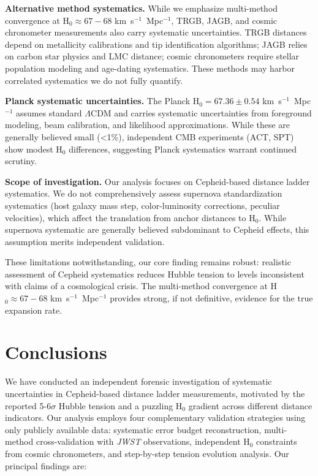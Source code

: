 \documentclass[twocolumn, linenumbers]{aastex701}
\begin{document}
\textbf{Alternative method systematics.} While we emphasize multi-method convergence at H$_0 \approx 67-68$ km~s$^{-1}$~Mpc$^{-1}$, TRGB, JAGB, and cosmic chronometer measurements also carry systematic uncertainties. TRGB distances depend on metallicity calibrations and tip identification algorithms; JAGB relies on carbon star physics and LMC distance; cosmic chronometers require stellar population modeling and age-dating systematics. These methods may harbor correlated systematics we do not fully quantify.

\textbf{Planck systematic uncertainties.} The Planck H$_0 = 67.36 \pm 0.54$ km~s$^{-1}$~Mpc$^{-1}$ assumes standard $\Lambda$CDM and carries systematic uncertainties from foreground modeling, beam calibration, and likelihood approximations. While these are generally believed small (<1\%), independent CMB experiments (ACT, SPT) show modest H$_0$ differences, suggesting Planck systematics warrant continued scrutiny.

\textbf{Scope of investigation.} Our analysis focuses on Cepheid-based distance ladder systematics. We do not comprehensively assess supernova standardization systematics (host galaxy mass step, color-luminosity corrections, peculiar velocities), which affect the translation from anchor distances to H$_0$. While supernova systematic are generally believed subdominant to Cepheid effects, this assumption merits independent validation.

These limitations notwithstanding, our core finding remains robust: realistic assessment of Cepheid systematics reduces Hubble tension to levels inconsistent with claims of a cosmological crisis. The multi-method convergence at H$_0 \approx 67-68$ km~s$^{-1}$~Mpc$^{-1}$ provides strong, if not definitive, evidence for the true expansion rate.


\section{Conclusions} \label{sec:conclusions}

We have conducted an independent forensic investigation of systematic uncertainties in Cepheid-based distance ladder measurements, motivated by the reported 5-6$\sigma$ Hubble tension and a puzzling H$_0$ gradient across different distance indicators. Our analysis employs four complementary validation strategies using only publicly available data: systematic error budget reconstruction, multi-method cross-validation with \textit{JWST} observations, independent H$_0$ constraints from cosmic chronometers, and step-by-step tension evolution analysis. Our principal findings are:
\end{document}
